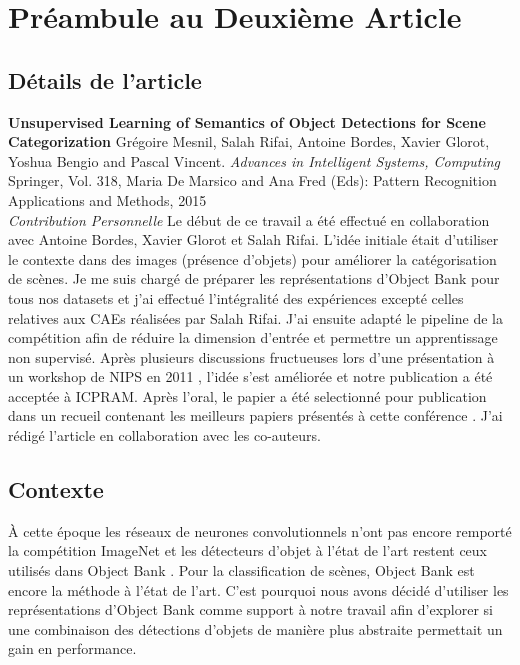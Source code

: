 \chapter{Pr\'{e}ambule au Deuxi\`{e}me Article }

\section{D\'{e}tails de l'article}

{ \bf Unsupervised Learning of Semantics of Object Detections for Scene
Categorization} Gr\'{e}goire Mesnil, Salah Rifai, Antoine Bordes, Xavier
Glorot, Yoshua Bengio and Pascal Vincent.  { \it Advances in Intelligent
Systems, Computing} Springer, Vol.  318, Maria De Marsico and Ana Fred (Eds):
Pattern Recognition Applications and Methods, 2015\\ 

{\it Contribution Personnelle} Le d\'{e}but de ce travail a \'{e}t\'{e}
effectu\'{e} en collaboration avec Antoine Bordes, Xavier Glorot et Salah
Rifai. L'id\'{e}e initiale \'{e}tait d'utiliser le contexte dans des images
(pr\'{e}sence d'objets) pour am\'{e}liorer la cat\'{e}gorisation de sc\`{e}nes.
Je me suis charg\'{e} de pr\'{e}parer les repr\'{e}sentations d'Object Bank
pour tous nos datasets et j'ai effectu\'{e} l'int\'{e}gralit\'{e} des
exp\'{e}riences except\'{e} celles relatives aux CAEs r\'{e}alis\'{e}es par
Salah Rifai. J'ai ensuite adapt\'{e} le pipeline de la comp\'{e}tition afin de
r\'{e}duire la dimension d'entr\'{e}e et permettre un apprentissage non
supervis\'{e}.  Apr\`{e}s plusieurs discussions fructueuses lors
d'une pr\'{e}sentation \`{a} un workshop de NIPS en 2011
\citep{Mesnil-workshop-nips}, l'id\'{e}e s'est am\'{e}lior\'{e}e et notre
publication \citep{Mesnil-icpram} a \'{e}t\'{e} accept\'{e}e \`{a} ICPRAM.
Apr\`{e}s l'oral, le papier a \'{e}t\'{e} selectionn\'{e} pour publication dans
un recueil contenant les meilleurs papiers pr\'{e}sent\'{e}s \`{a} cette
conf\'{e}rence \citep{Mesnil-icpram-journal}. J'ai r\'{e}dig\'{e} l'article en
collaboration avec les co-auteurs.

\section{Contexte}

\`{A} cette \'{e}poque les r\'{e}seaux de neurones convolutionnels n'ont pas
encore remport\'{e} la comp\'{e}tition ImageNet \citep{Krizhevsky-2012-small} et les
d\'{e}tecteurs d'objet \`{a} l'\'{e}tat de l'art restent ceux utilisés dans
Object Bank \citep{lsvm-pami}. Pour la classification de sc\`{e}nes, Object
Bank est encore la m\'{e}thode \`{a} l'\'{e}tat de l'art.  C'est pourquoi nous
avons d\'{e}cid\'{e} d'utiliser les repr\'{e}sentations d'Object Bank comme
support \`{a} notre travail afin d'explorer si une combinaison des
d\'{e}tections d'objets de mani\`{e}re plus abstraite permettait un gain en
performance.

